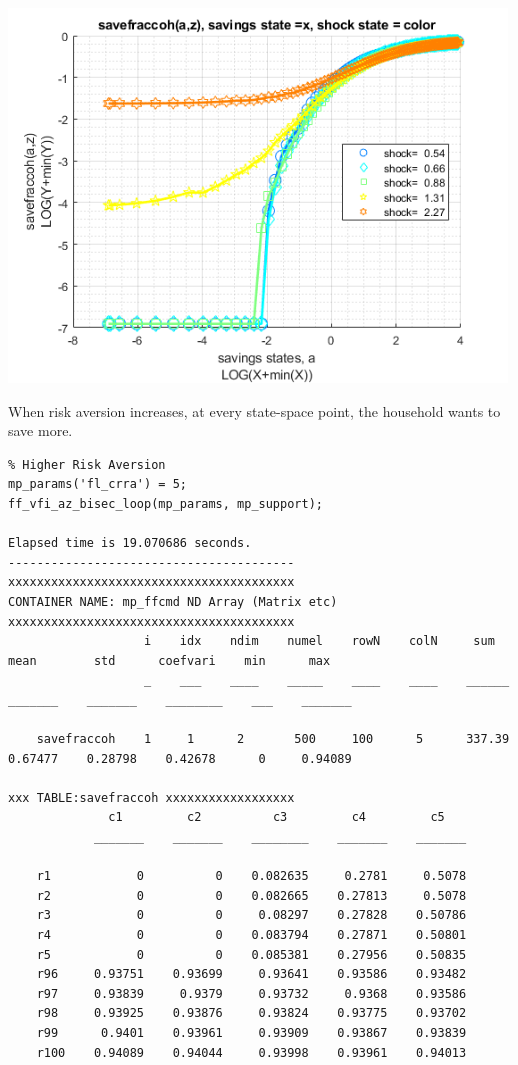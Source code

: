 \documentclass[
]{book}
\begin{document}
\includegraphics[width=5.20833in,height=\textheight]{img/fx_vfi_az_bisec_loop_images/figure_3.png}

When risk aversion increases, at every state-space point, the household
wants to save more.

\begin{verbatim}
% Higher Risk Aversion
mp_params('fl_crra') = 5;
ff_vfi_az_bisec_loop(mp_params, mp_support);

Elapsed time is 19.070686 seconds.
----------------------------------------
xxxxxxxxxxxxxxxxxxxxxxxxxxxxxxxxxxxxxxxx
CONTAINER NAME: mp_ffcmd ND Array (Matrix etc)
xxxxxxxxxxxxxxxxxxxxxxxxxxxxxxxxxxxxxxxx
                   i    idx    ndim    numel    rowN    colN     sum       mean        std      coefvari    min      max  
                   _    ___    ____    _____    ____    ____    ______    _______    _______    ________    ___    _______

    savefraccoh    1     1      2       500     100      5      337.39    0.67477    0.28798    0.42678      0     0.94089

xxx TABLE:savefraccoh xxxxxxxxxxxxxxxxxx
              c1         c2          c3         c4         c5   
            _______    _______    ________    _______    _______

    r1            0          0    0.082635     0.2781     0.5078
    r2            0          0    0.082665    0.27813     0.5078
    r3            0          0     0.08297    0.27828    0.50786
    r4            0          0    0.083794    0.27871    0.50801
    r5            0          0    0.085381    0.27956    0.50835
    r96     0.93751    0.93699     0.93641    0.93586    0.93482
    r97     0.93839     0.9379     0.93732     0.9368    0.93586
    r98     0.93925    0.93876     0.93824    0.93775    0.93702
    r99      0.9401    0.93961     0.93909    0.93867    0.93839
    r100    0.94089    0.94044     0.93998    0.93961    0.94013
\end{verbatim}
\end{document}
